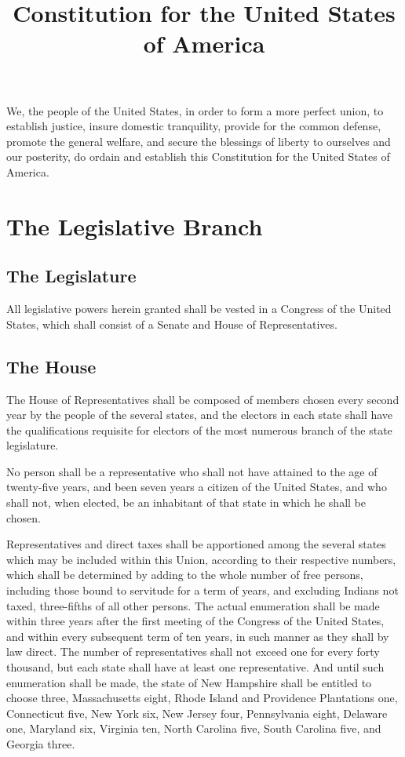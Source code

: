 \documentclass{constitution}
\title{Constitution for the United States of America}
\begin{document}
\maketitle
\tableofcontents*

\preamble
We, the people of the United States,
in order to form a more perfect union, to establish justice, insure domestic tranquility, provide for the common defense, promote the general welfare, and secure the blessings of liberty to ourselves and our posterity,
do ordain and establish this Constitution for the United States of America.

\chapter{The Legislative Branch}
\section{The Legislature}
All legislative powers herein granted shall be vested in a Congress of the United States,
which shall consist of a Senate and House of Representatives.

\section{The House}
The House of Representatives shall be composed of members chosen every second year by the people of the several states,
and the electors in each state shall have the qualifications requisite for electors of the most numerous branch of the state legislature.

No person shall be a representative who shall not have attained to the age of twenty-five years,
and been seven years a citizen of the United States,
and who shall not, when elected, be an inhabitant of that state in which he shall be chosen.

Representatives and direct taxes shall be apportioned among the several states which may be included within this Union, according to their respective numbers,
which shall be determined by adding to the whole number of free persons,
including those bound to servitude for a term of years,
and excluding Indians not taxed,
three-fifths of all other persons.
The actual enumeration shall be made within three years after the first meeting of the Congress of the United States, and within every subsequent term of ten years, in such manner as they shall by law direct.
The number of representatives shall not exceed one for every forty thousand,
but each state shall have at least one representative.
And until such enumeration shall be made, the state of New Hampshire shall be entitled to choose three, Massachusetts eight, Rhode Island and Providence Plantations one, Connecticut five, New York six, New Jersey four, Pennsylvania eight, Delaware one, Maryland six, Virginia ten, North Carolina five, South Carolina five, and Georgia three.
\end{document}
